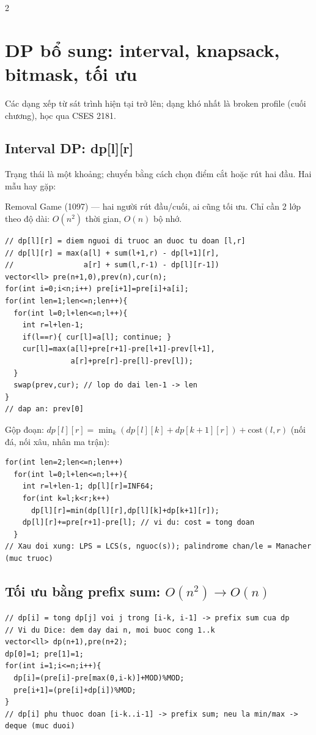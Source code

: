 \documentclass[8pt]{extarticle}
\begin{document}
\begin{multicols}{2}
\section{DP bổ sung: interval, knapsack, bitmask, tối ưu}
Các dạng xếp từ sát trình hiện tại trở lên; dạng khó nhất là broken profile (cuối chương), học qua CSES 2181.

\subsection{Interval DP: dp[l][r]}
Trạng thái là một khoảng; chuyển bằng cách chọn điểm cắt hoặc rút hai đầu. Hai mẫu hay gặp:

Removal Game (1097) --- hai người rút đầu/cuối, ai cũng tối ưu. Chỉ cần 2 lớp theo độ dài: $O(n^2)$ thời gian, $O(n)$ bộ nhớ.
\begin{lstlisting}
// dp[l][r] = diem nguoi di truoc an duoc tu doan [l,r]
// dp[l][r] = max(a[l] + sum(l+1,r) - dp[l+1][r],
//                a[r] + sum(l,r-1) - dp[l][r-1])
vector<ll> pre(n+1,0),prev(n),cur(n);
for(int i=0;i<n;i++) pre[i+1]=pre[i]+a[i];
for(int len=1;len<=n;len++){
  for(int l=0;l+len<=n;l++){
    int r=l+len-1;
    if(l==r){ cur[l]=a[l]; continue; }
    cur[l]=max(a[l]+pre[r+1]-pre[l+1]-prev[l+1],
               a[r]+pre[r]-pre[l]-prev[l]);
  }
  swap(prev,cur); // lop do dai len-1 -> len
}
// dap an: prev[0]
\end{lstlisting}

Gộp đoạn: $dp[l][r]=\min_k(dp[l][k]+dp[k+1][r])+\text{cost}(l,r)$ (nối đá, nối xâu, nhân ma trận):
\begin{lstlisting}
for(int len=2;len<=n;len++)
  for(int l=0;l+len<=n;l++){
    int r=l+len-1; dp[l][r]=INF64;
    for(int k=l;k<r;k++)
      dp[l][r]=min(dp[l][r],dp[l][k]+dp[k+1][r]);
    dp[l][r]+=pre[r+1]-pre[l]; // vi du: cost = tong doan
  }
// Xau doi xung: LPS = LCS(s, nguoc(s)); palindrome chan/le = Manacher (muc truoc)
\end{lstlisting}

\subsection{Tối ưu bằng prefix sum: $O(n^2)\to O(n)$}
\begin{lstlisting}
// dp[i] = tong dp[j] voi j trong [i-k, i-1] -> prefix sum cua dp
// Vi du Dice: dem day dai n, moi buoc cong 1..k
vector<ll> dp(n+1),pre(n+2);
dp[0]=1; pre[1]=1;
for(int i=1;i<=n;i++){
  dp[i]=(pre[i]-pre[max(0,i-k)]+MOD)%MOD;
  pre[i+1]=(pre[i]+dp[i])%MOD;
}
// dp[i] phu thuoc doan [i-k..i-1] -> prefix sum; neu la min/max -> deque (muc duoi)
\end{lstlisting}


\end{multicols}
\end{document}
